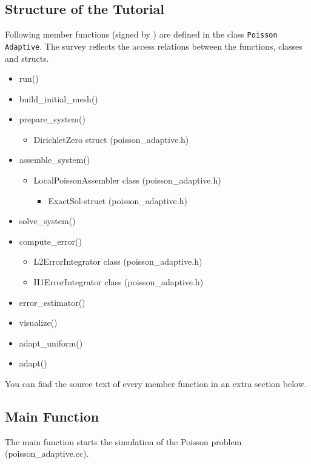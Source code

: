 \documentclass[a4paper, 11pt, twoside]{article}
\begin{document}
\subsection{Structure of the Tutorial}
Following member functions (signed by \textbullet) are defined in the class \texttt{Poisson Adaptive}. The survey reflects the  access relations between the functions, classes and structs. 
 \begin{itemize}
    \item run()
    \item build\_initial\_mesh()
    \item prepare\_system()
    \begin{itemize}
	\item DirichletZero struct (poisson\_adaptive.h)
    \end{itemize}
    \item assemble\_system()
    \begin{itemize}
	\item LocalPoissonAssembler class (poisson\_adaptive.h)
        \begin{itemize}
	    \item ExactSol-struct (poisson\_adaptive.h)
	\end{itemize}    
    \end{itemize}    
    \item solve\_system()
    \item compute\_error()
    \begin{itemize}
	\item L2ErrorIntegrator class (poisson\_adaptive.h)
	\item H1ErrorIntegrator class (poisson\_adaptive.h)    
    \end{itemize}  
    \item error\_estimator()
    \item visualize()
    \item adapt\_uniform()
    \item adapt()
 \end{itemize} 
You can find the source text of every member function in an extra section below. 

\subsection{Main Function}\label{sectionmain}
The main function starts the simulation of the Poisson problem (poisson\_adaptive.cc).
\end{document}
